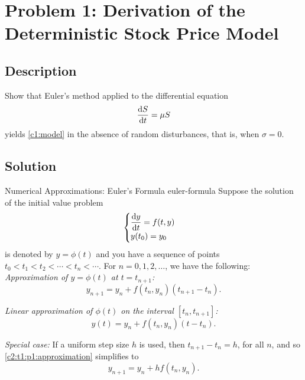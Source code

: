 \section{Problem 1: Derivation of the Deterministic Stock Price Model}
\subsection{Description}
Show that Euler's method applied to the differential equation
\begin{equation}
	\dv{S}{t} = \mu S
	\label{c2:p1:og}
\end{equation}
yields \eqref{c1:model} in the absence of random disturbances, that is, when $\sigma = 0$.

\subsection{Solution}
\begin{mytheo}{Numerical Approximations: Euler's Formula {}}{euler-formula}
	\small Suppose the solution of the initial value problem
	\begin{equation*}
		\begin{cases} 
			\displaystyle\dv{y}{t} = f(t, y) \\ 
			y(t_0) = y_0 
		\end{cases}
	\end{equation*}
	is denoted by $y = \phi(t)$ and you have a sequence of points $t_0 < t_1 < t_2 < \cdots < t_n < \cdots$. For $n = 0, 1, 2, \dots$, we have the following:\\
	
	\textit{Approximation of $y = \phi(t)$ at $t = t_{n+1}$:}
	\begin{equation}
		y_{n+1} = y_n + f(t_n, y_n)(t_{n+1} - t_n).
		\label{c2:t1:p1:approximation}
	\end{equation}
	
	\textit{Linear approximation of $\phi(t)$ on the interval $[t_n, t_{n+1}]$:}
	\begin{equation*}
		y(t) = y_n + f(t_n, y_n)(t - t_n).
	\end{equation*}
	
	\textit{Special case:}
	If a uniform step size $h$ is used, then $t_{n+1} - t_n = h$, for all $n$, and so \eqref{c2:t1:p1:approximation} simplifies to
	\begin{equation*}
		y_{n+1} = y_n + hf(t_n, y_n).
	\end{equation*}
\end{mytheo}

